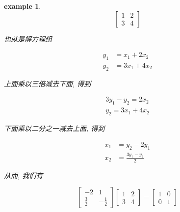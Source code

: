 \documentclass{ctexart}
\newtheorem{example}{example}
\begin{document}
    \begin{example}
        \begin{equation}
            \begin{bmatrix}
                1 & 2 \\
                3 & 4
            \end{bmatrix}
        \end{equation}

        也就是解方程组

        \begin{equation}
            \begin{aligned}
                y_1 &= x_1 + 2x_2  \\
                y_2 &= 3x_1 + 4x_2
            \end{aligned}
        \end{equation}

        上面乘以三倍减去下面, 得到

        \begin{equation}
            \begin{aligned}
                3y_1 - y_2 = 2x_2 \\
                y_2 = 3x_1 + 4x_2
            \end{aligned}
        \end{equation}

        下面乘以二分之一减去上面, 得到

        \begin{equation}
            \begin{aligned}
                x_1 &= y_2 - 2y_1 \\
                x_2 &= \frac{3y_1 - y_2}{2}
            \end{aligned}
        \end{equation}

        从而, 我们有

        \begin{equation}
            \begin{bmatrix}
                -2 & 1 \\
                \frac{3}{2} & -\frac{1}{2}
            \end{bmatrix} \begin{bmatrix}
                1 & 2 \\
                3 & 4
            \end{bmatrix} = \begin{bmatrix}
                1 & 0 \\
                0 & 1
            \end{bmatrix}
        \end{equation}


\end{example}
\end{document}
